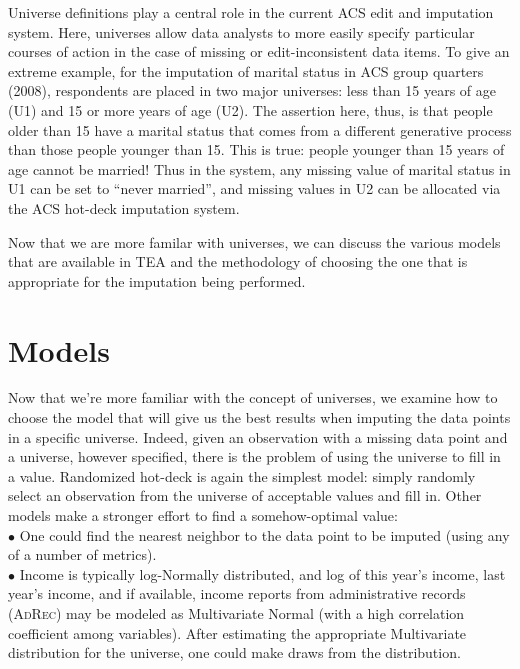 \documentclass{article}
\def\adrec{\textsc{AdRec}\xspace}
\begin{document}
Universe definitions play a central role in the current ACS edit and imputation system.
Here, universes allow data analysts to more easily specify particular courses of
action in the case of missing or edit-inconsistent data items. To give an extreme example, for the imputation of marital status in ACS group quarters (2008), respondents are placed
in two major universes: less than 15 years of age (U1) and 15 or more years of age
(U2). The assertion here, thus, is that people older than 15 have a marital status
that comes from a different generative process than those people younger than 15.
This is true: people younger than 15 years of age cannot be married!  Thus in the
system, any missing value of marital status in U1 can be set to ``never married'',
and missing values in U2 can be allocated via the ACS hot-deck imputation system.

Now that we are more familar with universes, we can discuss the various models that are 
available in TEA and the methodology of choosing the one that is appropriate for the 
imputation being performed.


\section{Models}
Now that we're more familiar with the concept of universes, we examine how to choose the 
model that will give us the best results when imputing the data points in a specific universe.
Indeed, given an observation with a missing data point and a universe, however specified, there is
the problem of using the universe to fill in a value. Randomized hot-deck is again
the simplest model: simply randomly select an observation from the universe of acceptable
values and fill in. Other models make a stronger effort to find a somehow-optimal value:\\

$\bullet$ One could find the nearest neighbor to the data point to be imputed (using any
of a number of metrics).\\

$\bullet$ Income is typically log-Normally distributed, and log of this year's income, last
year's income, and if available, income reports from administrative records (\adrec) may
be modeled as Multivariate Normal (with a high correlation
coefficient among variables). After estimating the appropriate Multivariate
distribution for the universe, one could make draws from the distribution.\\
\end{document}
